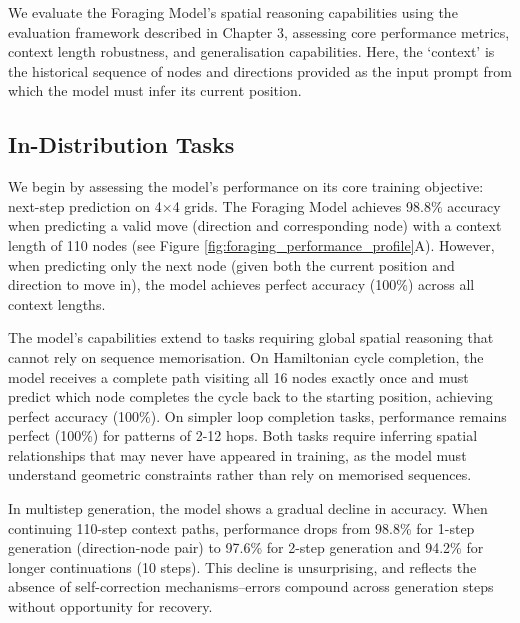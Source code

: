 We evaluate the Foraging Model's spatial reasoning capabilities using the evaluation framework described in Chapter 3, assessing core performance metrics, context length robustness, and generalisation capabilities. Here, the `context' is the historical sequence of nodes and directions provided as the input prompt from which the model must infer its current position.

\subsection{In-Distribution Tasks}

We begin by assessing the model's performance on its core training objective: next-step prediction on 4$\times$4 grids. The Foraging Model achieves 98.8\% accuracy when predicting a valid move (direction and corresponding node) with a context length of 110 nodes (see Figure \ref{fig:foraging_performance_profile}A). However, when predicting only the next node (given both the current position and direction to move in), the model achieves perfect accuracy (100\%) across all context lengths.

The model's capabilities extend to tasks requiring global spatial reasoning that cannot rely on sequence memorisation. On Hamiltonian cycle completion, the model receives a complete path visiting all 16 nodes exactly once and must predict which node completes the cycle back to the starting position, achieving perfect accuracy (100\%). On simpler loop completion tasks, performance remains perfect (100\%) for patterns of 2-12 hops. Both tasks require inferring spatial relationships that may never have appeared in training, as the model must understand geometric constraints rather than rely on memorised sequences.

In multistep generation, the model shows a gradual decline in accuracy. When continuing 110-step context paths, performance drops from 98.8\% for 1-step generation (direction-node pair) to 97.6\% for 2-step generation and 94.2\% for longer continuations (10 steps). This decline is unsurprising, and reflects the absence of self-correction mechanisms--errors compound across generation steps without opportunity for recovery.


